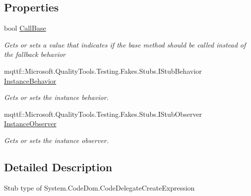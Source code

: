 \subsection*{Properties}
\begin{DoxyCompactItemize}
\item 
bool \hyperlink{class_system_1_1_code_dom_1_1_fakes_1_1_stub_code_delegate_create_expression_a4bbb35ff631dc1f9c54c0c4db107880f}{Call\-Base}
\begin{DoxyCompactList}\small\item\em Gets or sets a value that indicates if the base method should be called instead of the fallback behavior\end{DoxyCompactList}\item 
mqttf\-::\-Microsoft.\-Quality\-Tools.\-Testing.\-Fakes.\-Stubs.\-I\-Stub\-Behavior \hyperlink{class_system_1_1_code_dom_1_1_fakes_1_1_stub_code_delegate_create_expression_a00912058c301d0a44a7851a2ee3acc10}{Instance\-Behavior}
\begin{DoxyCompactList}\small\item\em Gets or sets the instance behavior.\end{DoxyCompactList}\item 
mqttf\-::\-Microsoft.\-Quality\-Tools.\-Testing.\-Fakes.\-Stubs.\-I\-Stub\-Observer \hyperlink{class_system_1_1_code_dom_1_1_fakes_1_1_stub_code_delegate_create_expression_aea8dce0aaa32aca1ddb142fc230d545e}{Instance\-Observer}
\begin{DoxyCompactList}\small\item\em Gets or sets the instance observer.\end{DoxyCompactList}\end{DoxyCompactItemize}


\subsection{Detailed Description}
Stub type of System.\-Code\-Dom.\-Code\-Delegate\-Create\-Expression



